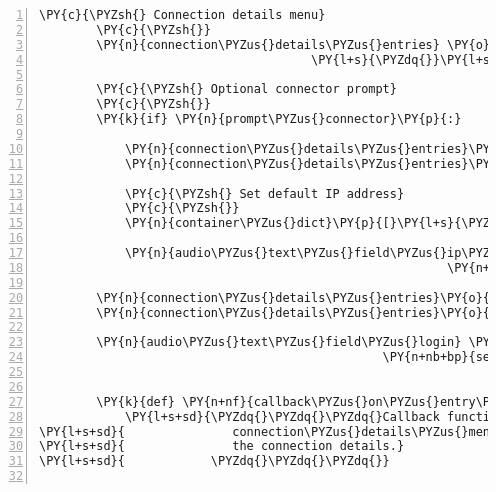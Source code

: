 \begin{Verbatim}[commandchars=\\\{\},numbers=left,firstnumber=1,stepnumber=1]
        \PY{c}{\PYZsh{} Connection details menu}
        \PY{c}{\PYZsh{}}
        \PY{n}{connection\PYZus{}details\PYZus{}entries} \PY{o}{=} \PY{p}{[}\PY{l+s}{\PYZdq{}}\PY{l+s}{Login name}\PY{l+s}{\PYZdq{}}\PY{p}{,}
                                      \PY{l+s}{\PYZdq{}}\PY{l+s}{Enter new login}\PY{l+s}{\PYZdq{}}\PY{p}{]}

        \PY{c}{\PYZsh{} Optional connector prompt}
        \PY{c}{\PYZsh{}}
        \PY{k}{if} \PY{n}{prompt\PYZus{}connector}\PY{p}{:}

            \PY{n}{connection\PYZus{}details\PYZus{}entries}\PY{o}{.}\PY{n}{append}\PY{p}{(}\PY{l+s}{\PYZdq{}}\PY{l+s}{IP address}\PY{l+s}{\PYZdq{}}\PY{p}{)}
            \PY{n}{connection\PYZus{}details\PYZus{}entries}\PY{o}{.}\PY{n}{append}\PY{p}{(}\PY{l+s}{\PYZdq{}}\PY{l+s}{Enter new IP address}\PY{l+s}{\PYZdq{}}\PY{p}{)}

            \PY{c}{\PYZsh{} Set default IP address}
            \PY{c}{\PYZsh{}}
            \PY{n}{container\PYZus{}dict}\PY{p}{[}\PY{l+s}{\PYZsq{}}\PY{l+s}{connector}\PY{l+s}{\PYZsq{}}\PY{p}{]} \PY{o}{=} \PY{l+s}{\PYZsq{}}\PY{l+s}{127.0.0.1}\PY{l+s}{\PYZsq{}}

            \PY{n}{audio\PYZus{}text\PYZus{}field\PYZus{}ip\PYZus{}address} \PY{o}{=} \PY{n}{AudioTextField}\PY{p}{(}\PY{l+s}{\PYZsq{}}\PY{l+s}{Enter IP address}\PY{l+s}{\PYZsq{}}\PY{p}{,}
                                                         \PY{n+nb+bp}{self}\PY{o}{.}\PY{n}{tts\PYZus{}engine}\PY{p}{)}

        \PY{n}{connection\PYZus{}details\PYZus{}entries}\PY{o}{.}\PY{n}{append}\PY{p}{(}\PY{l+s}{\PYZdq{}}\PY{l+s}{Start game}\PY{l+s}{\PYZdq{}}\PY{p}{)}
        \PY{n}{connection\PYZus{}details\PYZus{}entries}\PY{o}{.}\PY{n}{append}\PY{p}{(}\PY{l+s}{\PYZdq{}}\PY{l+s}{Exit}\PY{l+s}{\PYZdq{}}\PY{p}{)}

        \PY{n}{audio\PYZus{}text\PYZus{}field\PYZus{}login} \PY{o}{=} \PY{n}{AudioTextField}\PY{p}{(}\PY{l+s}{\PYZsq{}}\PY{l+s}{Enter login}\PY{l+s}{\PYZsq{}}\PY{p}{,}
                                                \PY{n+nb+bp}{self}\PY{o}{.}\PY{n}{tts\PYZus{}engine}\PY{p}{)}


        \PY{k}{def} \PY{n+nf}{callback\PYZus{}on\PYZus{}entry\PYZus{}selected}\PY{p}{(}\PY{n}{connection\PYZus{}details\PYZus{}menu}\PY{p}{)}\PY{p}{:}
            \PY{l+s+sd}{\PYZdq{}\PYZdq{}\PYZdq{}Callback function for entry selected in self.connection\PYZus{}details\PYZus{}menu.}
\PY{l+s+sd}{               connection\PYZus{}details\PYZus{}menu is supposed to be the TextMenuList for}
\PY{l+s+sd}{               the connection details.}
\PY{l+s+sd}{            \PYZdq{}\PYZdq{}\PYZdq{}}


\end{Verbatim}
